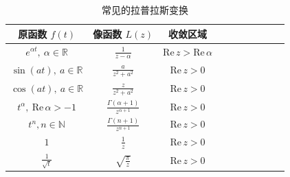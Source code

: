 \documentclass[UTF8]{report}
\def\Re{\mathrm{Re\,}}
\def\N{\mathbb{N}}
\def\R{\mathbb{R}}
\theoremstyle{MyLineTheoremStyle} %
\theoremstyle{MyBlockTheoremStyle} %
\theoremstyle{MySubsubsectionStyle} %
\begin{document}
\begin{table}[H]\centering \everymath{\displaystyle}
    \renewcommand{\arraystretch}{1.75} %
    \caption{常见的拉普拉斯变换}
    \label{常见的拉普拉斯变换}
\begin{tabular}{cccccccccc}\toprule
    原函数 $f(t)$ & 像函数 $L(z)$ & 收敛区域  \\
    \midrule
    $e^{\alpha t}, \ \alpha \in \R$ & $\frac{1}{z - \alpha}$ & $\Re z > \Re \alpha$  \\
    $\sin (a t),\ a \in \R$ & $\frac{a}{z^2 + a^2}$ & $\Re z > 0$  \\
    $\cos (a t),\ a \in \R$ & $\frac{z}{z^2 + a^2}$ & $\Re z > 0$  \\
    $t^\alpha,\ \Re \alpha > -1$ & $\frac{\Gamma(\alpha + 1)}{z^{\alpha + 1}}$ & $\Re z > 0$ \\ 
    $t^n, n \in \N$ & $\frac{\Gamma(n + 1)}{z^{n+1}}$ & $\Re z > 0$ \\ 
    $1$ & $\frac{1}{z}$ & $\Re z > 0$ \\ 
    $\frac{1}{\sqrt{t}}$ & $\sqrt{\frac{\pi}{z}}$ & $\Re z > 0$ \\ 
    \bottomrule
\end{tabular}
\end{table}
\end{document}
